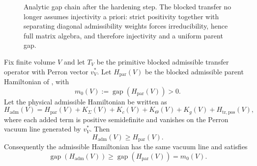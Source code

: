 \begin{figure}[t]
\centering
\scriptsize
{}
\caption{Analytic gap chain after the hardening step. The blocked transfer no longer assumes
injectivity a priori: strict positivity together with separating diagonal admissibility weights
forces irreducibility, hence full matrix algebra, and therefore injectivity and a uniform parent
gap.}
\label{fig:gap-hardening-chain}
\end{figure}

\begin{theorem}[Parent-Hamiltonian domination with \texorpdfstring{$\eta=0$}{eta=0}]
\label{lem:norm-stable-gap-parent-path}
\label{thm:eta-zero-parent-domination}
Fix finite volume $V$ and let $T_V$ be the primitive blocked admissible transfer operator with
Perron vector $v_V^\ast$. Let $H_{\mathrm{par}}(V)$ be the blocked admissible parent Hamiltonian of
, with
\[
m_0(V):=\operatorname{gap}(H_{\mathrm{par}}(V))>0.
\]
Let the physical admissible Hamiltonian be written as
\[
H_{\mathrm{adm}}(V)
=
H_{\mathrm{par}}(V)+K_\Sigma(V)+K_c(V)+K_\Theta(V)+K_g(V)+H_{\mathrm{tr,pos}}(V),
\]
where each added term is positive semidefinite and vanishes on the Perron vacuum line generated by
$v_V^\ast$. Then
\[
H_{\mathrm{adm}}(V)\ge H_{\mathrm{par}}(V).
\]
Consequently the admissible Hamiltonian has the same vacuum line and satisfies
\[
\operatorname{gap}(H_{\mathrm{adm}}(V))
\ge
\operatorname{gap}(H_{\mathrm{par}}(V))
=
m_0(V).
\]
\end{theorem}

